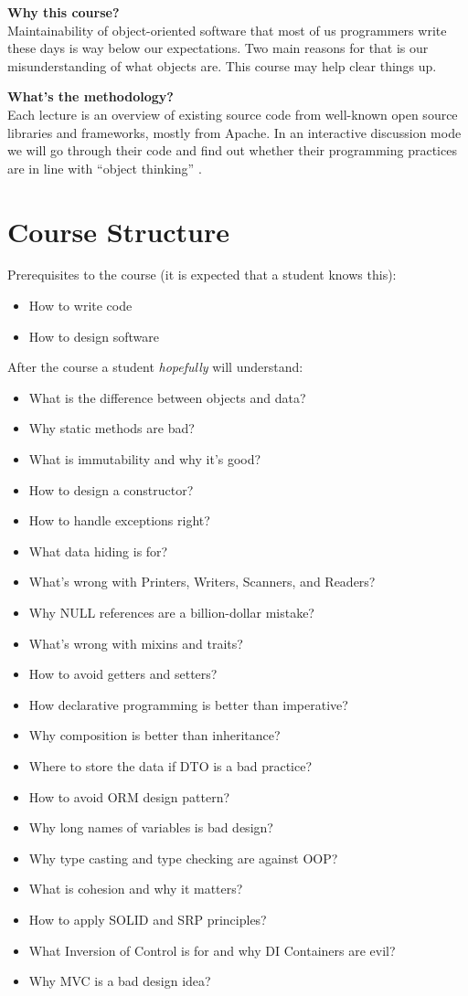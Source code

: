 \documentclass[nobrand,anonymous,nodate,nosecurity]{huawei}
\begin{document}
{\textbf{Why this course?}\\
Maintainability of object-oriented software that most of us programmers write these days is
way below our expectations. Two main reasons for that is our misunderstanding
of what objects are. This course may help clear things up.

\textbf{What's the methodology?}\\
Each lecture is an overview of existing source code from well-known open source
libraries and frameworks, mostly from Apache. In an interactive discussion mode
we will go through their code and find out whether their programming practices
are in line with ``object thinking'' .

\newpage
\section*{Course Structure}

Prerequisites to the course (it is expected that a student knows this):

\begin{itemize}
\item How to write code
\item How to design software
\end{itemize}

After the course a student \emph{hopefully} will understand:

\begin{itemize}
\item What is the difference between objects and data?
\item Why static methods are bad?
\item What is immutability and why it's good?
\item How to design a constructor?
\item How to handle exceptions right?
\item What data hiding is for?
\item What's wrong with Printers, Writers, Scanners, and Readers?
\item Why NULL references are a billion-dollar mistake?
\item What's wrong with mixins and traits?
\item How to avoid getters and setters?
\item How declarative programming is better than imperative?
\item Why composition is better than inheritance?
\item Where to store the data if DTO is a bad practice?
\item How to avoid ORM design pattern?
\item Why long names of variables is bad design?
\item Why type casting and type checking are against OOP?
\item What is cohesion and why it matters?
\item How to apply SOLID and SRP principles?
\item What Inversion of Control is for and why DI Containers are evil?
\item Why MVC is a bad design idea?
\end{itemize}

}
\end{document}
